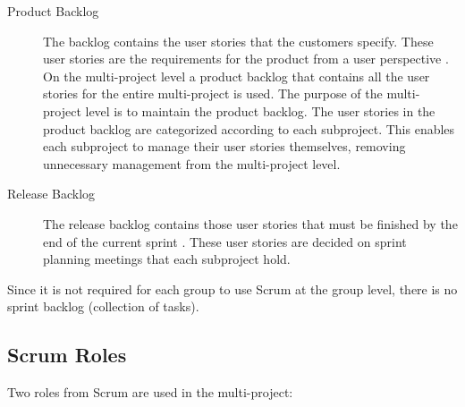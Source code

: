 \begin{description}
  \item[Product Backlog] The backlog contains the user stories that the customers specify. These user stories are the requirements for the product from a user perspective \parencite{larman2003}. On the multi-project level a product backlog that contains all the user stories for the entire multi-project is used. The purpose of the multi-project level is to maintain the product backlog. The user stories in the product backlog are categorized according to each subproject. This enables each subproject to manage their user stories themselves, removing unnecessary management from the multi-project level.
  \item[Release Backlog] The release backlog contains those user stories that must be finished by the end of the current sprint \parencite{larman2003}. These user stories are decided on sprint planning meetings that each subproject hold.
\end{description}

Since it is not required for each group to use Scrum at the group level, there is no sprint backlog (collection of tasks).

\subsection{Scrum Roles}
Two roles from Scrum are used in the multi-project:


